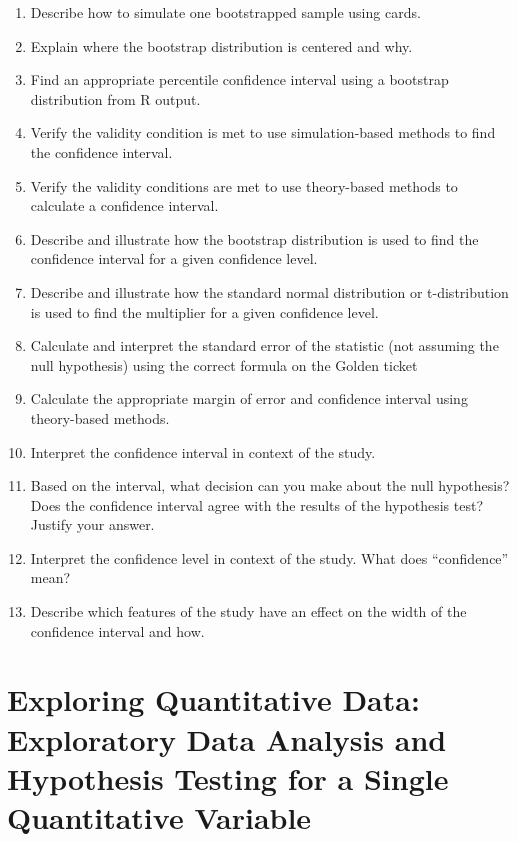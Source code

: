\documentclass[
]{report}
\begin{document}
\begin{enumerate}
\def\labelenumi{\arabic{enumi}.}
\setcounter{enumi}{26}
\item
  Describe how to simulate one bootstrapped sample using cards.
\item
  Explain where the bootstrap distribution is centered and why.
\item
  Find an appropriate percentile confidence interval using a bootstrap distribution from R output.
\item
  Verify the validity condition is met to use simulation-based methods to find the confidence interval.
\item
  Verify the validity conditions are met to use theory-based methods to calculate a confidence interval.
\item
  Describe and illustrate how the bootstrap distribution is used to find the confidence interval for a given confidence level.
\item
  Describe and illustrate how the standard normal distribution or t-distribution is used to find the multiplier for a given confidence level.
\item
  Calculate and interpret the standard error of the statistic (not assuming the null hypothesis) using the correct formula on the Golden ticket
\item
  Calculate the appropriate margin of error and confidence interval using theory-based methods.
\item
  Interpret the confidence interval in context of the study.
\item
  Based on the interval, what decision can you make about the null hypothesis? Does the confidence interval agree with the results of the hypothesis test? Justify your answer.
\item
  Interpret the confidence level in context of the study. What does ``confidence'' mean?
\item
  Describe which features of the study have an effect on the width of the confidence interval and how.
\end{enumerate}

\newpage

\chapter{Exploring Quantitative Data: Exploratory Data Analysis and Hypothesis Testing for a Single Quantitative Variable}\label{exploring-quantitative-data-exploratory-data-analysis-and-hypothesis-testing-for-a-single-quantitative-variable}
\end{document}
